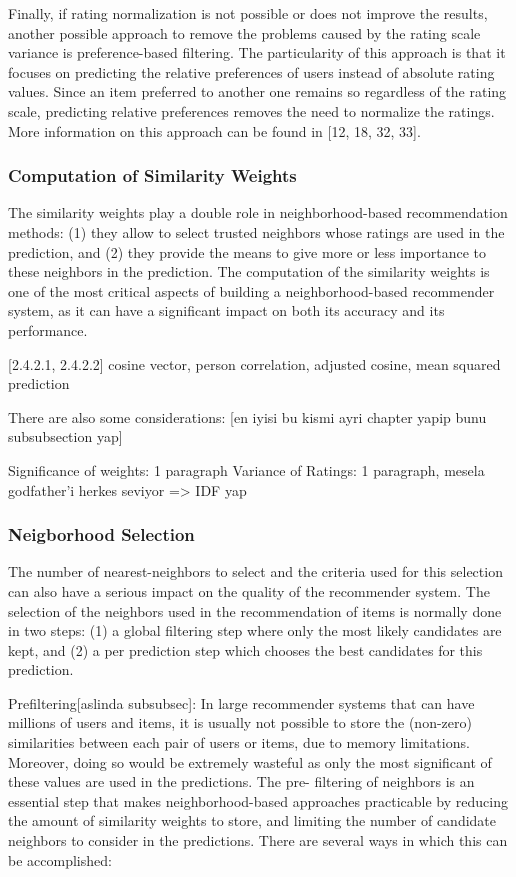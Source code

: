 Finally, if rating normalization is not possible or does not improve the results, another possible approach to remove the problems caused by the rating scale variance is preference-based filtering. The particularity of this approach is that it focuses on predicting the relative preferences of users instead of absolute rating values. Since an item preferred to another one remains so regardless of the rating scale, predicting relative preferences removes the need to normalize the ratings. More information on this approach can be found in [12, 18, 32, 33].

\subsubsection{Computation of Similarity Weights}


The similarity weights play a double role in neighborhood-based recommendation methods: (1) they allow to select trusted neighbors whose ratings are used in the prediction, and (2) they provide the means to give more or less importance to these neighbors in the prediction. The computation of the similarity weights is one of the most critical aspects of building a neighborhood-based recommender system, as it can have a significant impact on both its accuracy and its performance.

[2.4.2.1, 2.4.2.2]  cosine vector, person correlation, adjusted cosine, mean squared prediction


There are also some considerations: [en iyisi bu kismi ayri chapter yapip bunu subsubsection yap]

Significance of weights: 1 paragraph
Variance of Ratings: 1 paragraph, mesela godfather'i herkes seviyor => IDF yap

\subsubsection{Neigborhood Selection}


The number of nearest-neighbors to select and the criteria used for this selection can also have a serious impact on the quality of the recommender system. The selection of the neighbors used in the recommendation of items is normally done in two steps: (1) a global filtering step where only the most likely candidates are kept, and (2) a per prediction step which chooses the best candidates for this prediction.

Prefiltering[aslinda subsubsec]: In large recommender systems that can have millions of users and items, it is usually not possible to store the (non-zero) similarities between each pair of users or items, due to memory limitations. Moreover, doing so would be extremely wasteful as only the most significant of these values are used in the predictions. The pre- filtering of neighbors is an essential step that makes neighborhood-based approaches practicable by reducing the amount of similarity weights to store, and limiting the number of candidate neighbors to consider in the predictions. There are several ways in which this can be accomplished:

